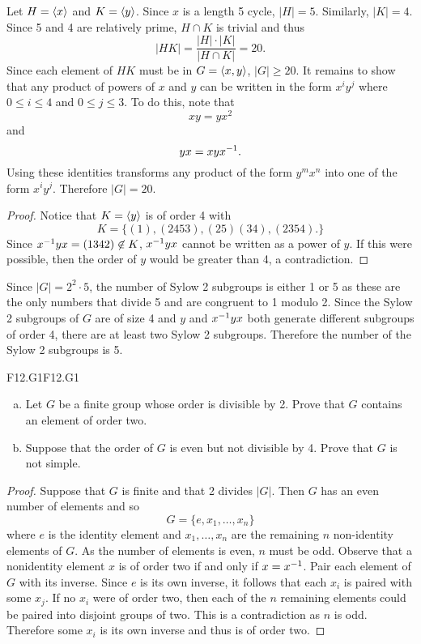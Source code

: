 \documentclass[../../AlgebraQualSolutions.tex]{subfiles}
\begin{document}
	\begin{solution}
		Let $H = \left\langle x \right\rangle$ and $K = \left\langle y \right\rangle$. Since $x$ is a length 5 cycle, $|H| = 5$. Similarly, $|K| = 4$. Since 5 and 4 are relatively prime, $H \cap K$ is trivial and thus
			\[|HK| = \frac{|H|\cdot|K|}{|H \cap K|} = 20. \]
		Since each element of $HK$ must be in $G = \left\langle x,y \right\rangle$, $|G| \geq 20$. It remains to show that any product of powers of $x$ and $y$ can be written  in the form $x^iy^j$ where $0 \leq i \leq 4$ and  $0 \leq j \leq 3$. To do this, note that
			\[xy = yx^2\]
		and
			\[yx = xyx^{-1}.\]
		Using these identities transforms any product of the form $y^mx^n$ into one of the form $x^iy^j$. Therefore $|G| = 20$.
	\end{solution}

	\begin{proof}
		Notice that $K = \left\langle y \right\rangle$ is of order 4 with
			\[K = \{(1), (2453), (25)(34), (2354).\}\]
		Since $x^{-1} y x = (1342) \not\in K$, $x^{-1} y x$ cannot be written as a power of $y$. If this were possible, then the order of $y$ would be greater than 4, a contradiction.
	\end{proof}

	\begin{solution}
		Since $|G| = 2^2 \cdot 5$, the number of Sylow 2 subgroups is either 1 or 5 as these are the only numbers that divide 5 and are congruent to 1 modulo 2. Since the Sylow 2 subgroups of $G$ are of size 4 and $y$ and $x^{-1} y x$ both generate different subgroups of order 4, there are at least two Sylow 2 subgroups. Therefore the number of the Sylow 2 subgroups is 5.
	\end{solution}

	\begin{prob}{F12.G1}{F12.G1}
	\begin{enumerate}[(a)]
	\item Let $G$ be a finite group whose order is divisible by 2. Prove that $G$ contains an element of order two.
	\item Suppose that the order of $G$ is even but not divisible by 4. Prove that $G$ is not simple.
	\end{enumerate}
	\end{prob}
	
	\begin{proof}
	Suppose that $G$ is finite and that 2 divides $|G|$. Then $G$ has an even number of elements and so
		\[G = \{e, x_1, \ldots, x_n\}\]
	where $e$ is the identity element and $x_1, \ldots, x_n$ are the remaining $n$ non-identity elements of $G$. As the number of elements is even, $n$ must be odd. Observe that a nonidentity element $x$ is of order two if and only if $x = x^{-1}$. Pair each element of $G$ with its inverse. Since $e$ is its own inverse, it follows that each $x_i$ is paired with some $x_j$. If no $x_i$ were of order two, then each of the $n$ remaining elements could be paired into disjoint groups of two. This is a contradiction as $n$ is odd. Therefore some $x_i$ is its own inverse and thus is of order two. 
	\end{proof}
	
\end{document}
